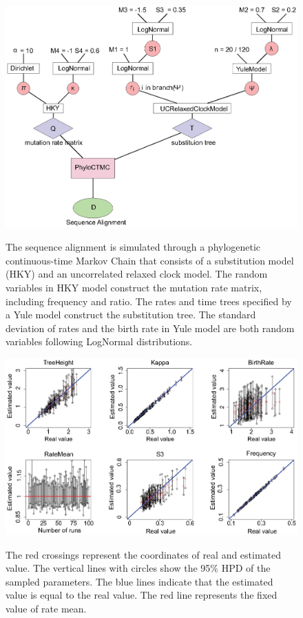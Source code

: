 \documentclass{bmcart}
\begin{document}
\begin{backmatter}
\begin{figure}[h!]
\includegraphics[width=12cm]{Fig11-modelvalidation.eps}\\
\caption{
             The sequence alignment is simulated through a phylogenetic continuous-time Markov Chain that consists of a substitution model (HKY) and an uncorrelated relaxed clock model. The random variables in HKY model construct the mutation rate matrix, including frequency and ratio. The rates and time trees specified by a Yule model construct the substitution tree. The standard deviation of rates and the birth rate in Yule model are both random variables following LogNormal distributions.}
\label{modelvalidation}
\end{figure}

\begin{figure}[h!]
\includegraphics[width=12cm]{Fig12-smalltree.eps}\\
\caption{
             The red crossings represent the coordinates of real and estimated value. The vertical lines with circles show the 95\% HPD of the sampled parameters. The blue lines indicate that the estimated value is equal to the real value. The red line represents the fixed value of rate mean.}
\label{SmallTree}
\end{figure}


\end{backmatter}
\end{document}
